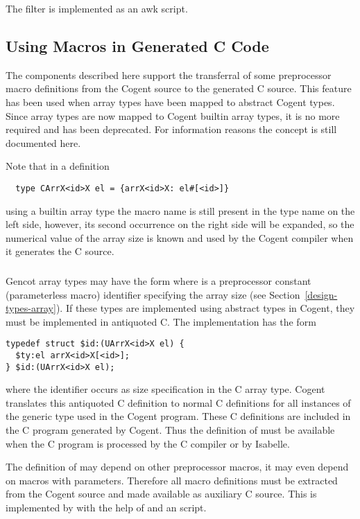 The filter is implemented as an awk script.

\subsection{Using Macros in Generated C Code}
\label{impl-ocomps-macros}

The components described here support the transferral of some preprocessor macro definitions from the Cogent source
to the generated C source. This feature has been used when array types have been mapped to abstract Cogent types. 
Since array types are now mapped to Cogent builtin array types, it is no more required and has been deprecated. For
information reasons the concept is still documented here.

Note that in a definition 
\begin{verbatim}
  type CArrX<id>X el = {arrX<id>X: el#[<id>]}
\end{verbatim}
using a builtin array type the macro name  is still present in the type name on the left side, however, its
second occurrence on the right side will be expanded, so the numerical value of the array size is known and used by the Cogent compiler
when it generates the C source.

\subsubsection{}

Gencot array types may have the form  where  is a preprocessor constant (parameterless macro) 
identifier specifying the array size (see Section~\ref{design-types-array}). If these types are implemented using
abstract types in Cogent, they must be implemented in antiquoted C. The implementation has the form 
\begin{verbatim}
typedef struct $id:(UArrX<id>X el) {
  $ty:el arrX<id>X[<id>];
} $id:(UArrX<id>X el);
\end{verbatim}
where the identifier  occurs as size specification in the C array type. Cogent translates this antiquoted 
C definition to normal C definitions for all instances of the generic type used in the Cogent program. These C definitions
are included in the C program generated by Cogent.
Thus the definition of  must be available when the C program is processed by the C compiler or by Isabelle.

The definition of  may depend on other preprocessor macros, it may even depend on macros with parameters.
Therefore all macro definitions must be extracted from the Cogent source and made available as auxiliary C source.
This is implemented by  with the help of  and an  script.

